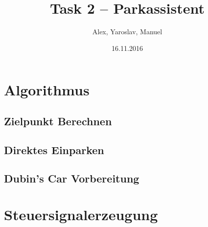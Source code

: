 \documentclass[12pt]{beamer}
\title{Task 2 -- Parkassistent}
\institute{EvoTest}
\author{Alex, Yaroslav, Manuel}
\date{16.11.2016}
\begin{document}
\maketitle 


\section{Algorithmus}

\subsection{Zielpunkt Berechnen}

\subsection{Direktes Einparken}

\subsection{Dubin's Car Vorbereitung}


\section{Steuersignalerzeugung}

\end{document}
